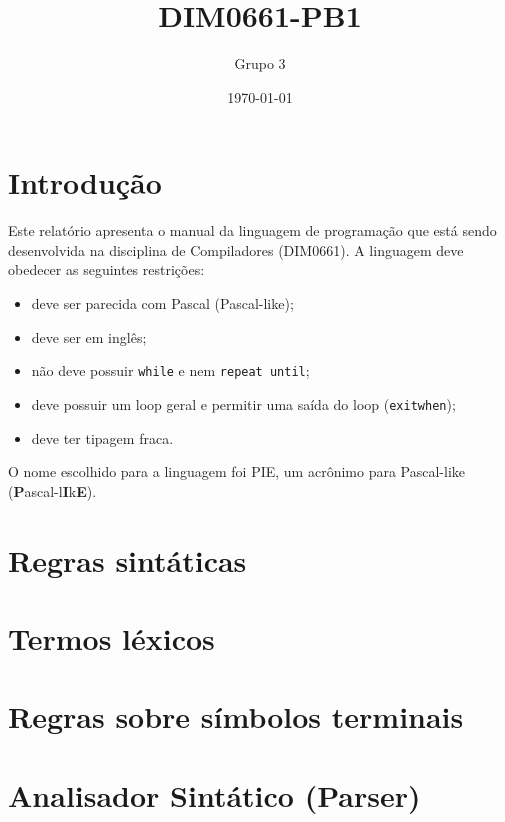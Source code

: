 \documentclass[12pt]{report}
\title{DIM0661-PB1}
\author{Grupo 3}
\date{\today}
\begin{document}
\maketitle

\tableofcontents

\chapter{Introdução}
Este relatório apresenta o manual da linguagem de programação que está sendo desenvolvida na disciplina de Compiladores (DIM0661). A linguagem deve obedecer as seguintes restrições:

\begin{changemargin}{1cm}{1cm}
\begin{itemize}
    \item deve ser parecida com Pascal (Pascal-like);
    \item deve ser em inglês;
    \item não deve possuir \texttt{while} e nem \texttt{repeat until};
    \item deve possuir um loop geral e permitir uma saída do loop (\texttt{exitwhen});
    \item deve ter tipagem fraca.
\end{itemize}
\end{changemargin}

O nome escolhido para a linguagem foi PIE, um acrônimo para Pascal-like (\textbf{P}ascal-l\textbf{I}k\textbf{E}).

\chapter{Regras sintáticas}


\newpage
\chapter{Termos léxicos}


\newpage
\chapter{Regras sobre símbolos terminais}


\newpage
\chapter{Analisador Sintático (Parser)}

\end{document}
